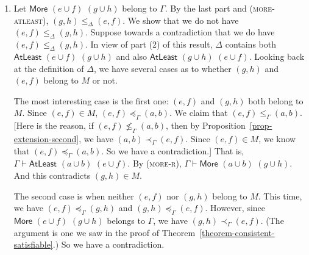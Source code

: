 \documentclass[letterpaper]{article} %
\theoremstyle{definition}
\newcommand{\proves}{\vdash}
\newcommand{\proverule}{\textsc}
\newcommand{\morel}{\proverule{more-l}}
\newcommand{\morer}{\proverule{more-r}}
\newcommand{\moreatleast}{\proverule{more-atleast}}
\newcommand{\Atleast}[2]{\mathsf{AtLeast}\,\,#1\,\,#2}
\newcommand{\More}[2]{\mathsf{More}\,\,#1\,\,#2}
\newcommand{\provle}{\le_{\Gamma}}
\newcommand{\provleDelta}{\le_{\Delta}}
\newcommand{\nprovle}{\nleq_{\Gamma}}
\newcommand{\provextended}{\preceq_{\Gamma}}
\newcommand{\provextendedstrict}{\prec_{\Gamma}}
\begin{document}
{{\begin{enumerate}
We 
have four cases as to whether  each of
$(e,f)$ and $(g,h)$ belongs to $M$ or not.

If both $(e,f)$ and $(g,h)$ belong to $M$, then since 
 $\Gamma\proves \Atleast{(e\cup f)}{(g\cup h)}$, our sentence belongs to $\Delta$.

Suppose that neither  $(e,f)$ nor $(g,h)$ belong to $M$.
Since  $\Gamma\proves \Atleast{(e\cup f)}{(g\cup h)}$,  
 our sentence belongs to $\Delta$.

The next, and most interesting, case: $(e,f)\notin M$, $(g,h)\in  M$.
We claim that 
$(a,b) \provextended (e,f)$, and this will finish this case.
For if not, we have $(e,f) \provextended (a,b)$, by linearity.
Since $(e,f)\notin M$, $\Gamma\proves  \More{(a\cup b)}{(e\cup f)}$.
By  (\morel), $\Gamma\proves \More{(a\cup b)}{(g\cup h)}$.
And this contradicts $(g,h)\in M$.


The final case: $(e,f)\in M$, $(g,h)\notin  M$.
We claim that 
$(g,h) \provextended (a,b)$, and this will finish this case.
If not, then $(a,b) \provextendedstrict (g,h)$ by linearity.  
As we have seen, $(g,h) \provextended (e,f)$.
So $(a,b) \provextendedstrict (e,f)$.
This contradicts $(e,f)\in M$.




\item  Let   $\More{(e\cup f)}{(g\cup h)}$ belong  to $\Gamma$.
By the last part and (\moreatleast),  $(g,h)\provleDelta (e,f)$.
We show that we do not have  $(e,f)\provleDelta  (g,h)$.
Suppose towards a contradiction that we do have  $(e,f)\provleDelta  (g,h)$.
In view of part (2) of this result, $\Delta$ contains
both 
$\Atleast{(e\cup f)}{(g\cup h)}$
and also 
$\Atleast{(g\cup h)}{(e\cup f)}$.
Looking back at the definition of $\Delta$,  we 
have several cases as to whether 
$(g,h)$ and $(e,f)$ belong to $M$ or not.

 
The most interesting case is the first one: $(e,f)$ and $(g,h)$ both belong to $M$.
Since $(e,f)\in M$, $(e,f)\provextended (a,b)$.
We claim that   $(e,f)\provle (a,b)$.  
[Here is the reason, if $(e,f)\nprovle (a,b)$, then 
by Proposition~\ref{prop-extension-second}, we have $(a,b)\provextendedstrict (e,f)$.
Since $(e,f)\in M$, we know that $(e,f)\provextended (a,b)$.  
So we have a contradiction.]   
That is, $\Gamma\proves \Atleast{(a\cup b)}{(e\cup f)}$.
By  (\morer), $\Gamma\proves \More{(a\cup b)}{(g\cup h)}$.  
And this contradicts $(g,h)\in M$.

The second case is when neither $(e,f)$ nor $(g,h)$ belong to $M$.
This time, we have $(e,f)\provextended (g,h)$ and $(g,h)\provextended (e,f)  $.
However, since $\More{(e\cup f)}{(g\cup h)}$ belongs  to $\Gamma$,
we have $(g,h)\provextendedstrict (e,f)  $.
(The argument is one we saw in the proof of Theorem~\ref{theorem-consistent-satisfiable}.)
So we have a contradiction.


\end{enumerate}}}
\end{document}
